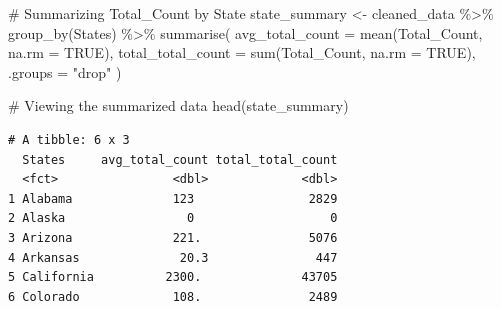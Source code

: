 \documentclass[
  12pt,
]{article}
\newenvironment{Shaded}{\begin{snugshade}}{\end{snugshade}}
\newcommand{\AttributeTok}[1]{\textcolor[rgb]{0.40,0.45,0.13}{#1}}
\newcommand{\CommentTok}[1]{\textcolor[rgb]{0.37,0.37,0.37}{#1}}
\newcommand{\ConstantTok}[1]{\textcolor[rgb]{0.56,0.35,0.01}{#1}}
\newcommand{\FunctionTok}[1]{\textcolor[rgb]{0.28,0.35,0.67}{#1}}
\newcommand{\NormalTok}[1]{\textcolor[rgb]{0.00,0.23,0.31}{#1}}
\newcommand{\OtherTok}[1]{\textcolor[rgb]{0.00,0.23,0.31}{#1}}
\newcommand{\SpecialCharTok}[1]{\textcolor[rgb]{0.37,0.37,0.37}{#1}}
\newcommand{\StringTok}[1]{\textcolor[rgb]{0.13,0.47,0.30}{#1}}
\begin{document}
\begin{Shaded}
\begin{Highlighting}[]
\CommentTok{\# Summarizing Total\_Count by State}
\NormalTok{state\_summary }\OtherTok{\textless{}{-}}\NormalTok{ cleaned\_data }\SpecialCharTok{\%\textgreater{}\%}
  \FunctionTok{group\_by}\NormalTok{(States) }\SpecialCharTok{\%\textgreater{}\%}
  \FunctionTok{summarise}\NormalTok{(}
    \AttributeTok{avg\_total\_count =} \FunctionTok{mean}\NormalTok{(Total\_Count, }\AttributeTok{na.rm =} \ConstantTok{TRUE}\NormalTok{),}
    \AttributeTok{total\_total\_count =} \FunctionTok{sum}\NormalTok{(Total\_Count, }\AttributeTok{na.rm =} \ConstantTok{TRUE}\NormalTok{),}
    \AttributeTok{.groups =} \StringTok{"drop"}
\NormalTok{  )}

\CommentTok{\# Viewing the summarized data}
\FunctionTok{head}\NormalTok{(state\_summary)}
\end{Highlighting}
\end{Shaded}

\begin{verbatim}
# A tibble: 6 x 3
  States     avg_total_count total_total_count
  <fct>                <dbl>             <dbl>
1 Alabama              123                2829
2 Alaska                 0                   0
3 Arizona              221.               5076
4 Arkansas              20.3               447
5 California          2300.              43705
6 Colorado             108.               2489
\end{verbatim}
\end{document}
